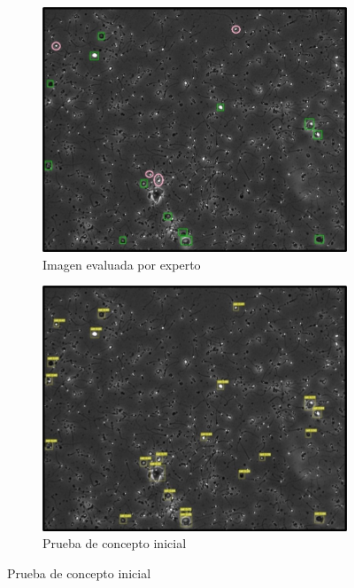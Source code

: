 \documentclass[12pt,a4paper,onecolumn,oneside]{report}
\begin{document}
\begin{figure}[H]
  \centering
  \begin{subfigure}[b]{0.48\textwidth}
    \centering
    \includegraphics[width=\textwidth]{figuras/evaluacion_cualitativa/347/347.jpg}
    \caption{Imagen evaluada por experto}
    \label{fig:exp_image_347}
  \end{subfigure}
  \hfill
  \begin{subfigure}[b]{0.48\textwidth}
    \centering
    \includegraphics[width=\textwidth]{figuras/evaluacion_cualitativa/347/347_v7.jpg}
    \caption{Prueba de concepto inicial}
    \label{fig:poc_image_347}
  \end{subfigure}
  

\end{figure}
\end{document}
